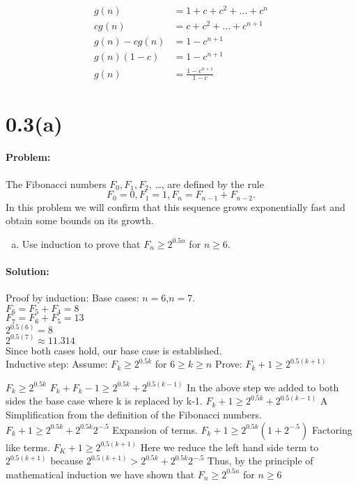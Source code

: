 \documentclass[12pt]{article}
\begin{document}
\begin{align*}
    g(n) &= 1 + c + c^2 + \dots + c^{n} \\
    cg(n) &= c + c^2 + \dots + c^{n+1} \\
    g(n) - cg(n) &= 1 - c^{n+1} \\
    g(n)(1 - c) &= 1 - c^{n+1} \\
    g(n) &= \frac{1 - c^{n+1}}{1 - c}
\end{align*}

\section*{0.3(a)}
\paragraph{Problem:}
The Fibonacci numbers $F_0, F_1, F_2$, \ldots, are defined by the rule
\[ F_0 = 0, F_1 = 1, F_n = F_{n - 1} + F_{n - 2}. \]
In this problem we will confirm that this sequence grows exponentially
fast and obtain some
bounds on its growth.

\begin{enumerate}[(a)]
\item Use induction to prove that $F_n \geq 2^{0.5n}$ for $n \geq 6$.
\end{enumerate}

\paragraph{Solution:}
Proof by induction:
Base cases: $n=6$,$n=7$. \\
    $F_6 = F_5 + F_4 = 8$ \\
    $F_7 = F_6 + F_5 = 13$ \\
    $2^{0.5(6)} = 8$ \\
    $2^{0.5(7)} \approx 11.314$ \\
    Since both cases hold, our base case is established. \\

Inductive step:
	Assume: $F_k \geq 2^{0.5k}$ for $6 \geq k \geq n$
	Prove: $F_k+1 \geq 2^{0.5(k+1)}$

	$F_k \geq 2^{0.5k}$
	$F_k + F_k-1 \geq 2^{0.5k} + 2^{0.5(k-1)}$
		In the above step we added to both sides the base case where k is replaced by k-1.
	$F_k+1 \geq 2^{0.5k} + 2^{0.5(k-1)}$
		A Simplification from the definition of the Fibonacci numbers.
	$F_k+1 \geq 2^{0.5k} + 2^{0.5k}2^{-.5}$
		Expansion of terms.
	$F_k+1 \geq 2^{0.5k}(1 + 2^{-.5})$
		Factoring like terms.
	$F_K+1 \geq 2^{0.5(k+1)}$
		Here we reduce the left hand side term to $2^{0.5(k+1)}$ because $2^{0.5(k+1)} > 2^{0.5k}+2^{0.5k}2^{-.5}$ 
	Thus, by the principle of mathematical induction we have shown that $F_n \geq 2^{0.5n}$ for $n \geq 6$ 
	
\end{document}
